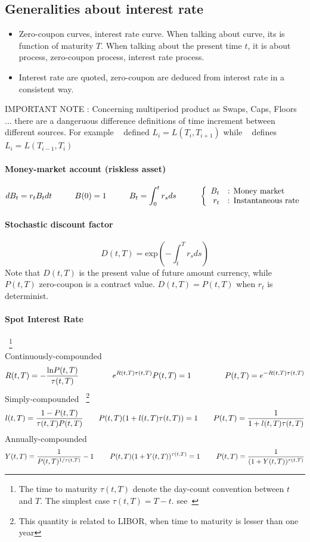\documentclass[a4paper,10pt]{article}
\newcommand{\Bt}{B_t}
\newcommand{\RtT}{R(t,T)}
\newcommand{\PtT}{P(t,T)}
\newcommand{\LtT}{l(t,T)}
\newcommand{\YtT}{Y(t,T)}
\newcommand{\tautT}{\tau(t,T)}
\newcommand{\inttT}{\int_t^T}
\newcommand{\intt}{\int_0^t}
\newcommand{\FuncExp}{\text{exp}}
\newcommand{\FuncLn}{\text{ln}}
\begin{document}
\subsection{Generalities about interest rate}
\begin{itemize}
 \item Zero-coupon curves, interest rate curve. When talking about curve, its is function of maturity $T$. When talking about the present time $t$, it is about process, zero-coupon process, interest rate process.
 \item Interest rate are quoted, zero-coupon are deduced from interest rate in a consistent way.
\end{itemize}
{\color{red}IMPORTANT NOTE : Concerning multiperiod product as Swaps, Caps, Floors ... there are a dangeruous difference definitions of time increment between different sources. For example ~\cite{THAI2013} defined $L_i=L(T_i,T_{i+1})$ while ~\cite{BRIGO2006} defines $L_i=L(T_{i-1},T_i)$}
\paragraph{Money-market account (riskless asset)}
\[
d\Bt=r_t \Bt dt \hspace{1cm} B(0)=1 \hspace{1cm} B_t = \intt r_s ds
\hspace{1cm}
\left\{
\begin{array}{r l}
\Bt &\text{: Money market} \\
r_t &\text{: Instantaneous rate} 
\end{array}
\right.
\]
\paragraph{Stochastic discount factor} 
\[
D(t,T) = \FuncExp\left( -\inttT r_s ds \right)
\]
Note that $D(t,T)$ is the present value of future amount currency, while $\PtT$ zero-coupon is a contract value. $D(t,T)=\PtT$ when $r_t$ is determinist.
\paragraph{Spot Interest Rate}~\footnote{The time to maturity $\tautT$ denote the day-count convention between $t$ and $T$. The simplest case $\tautT=T-t$. see~\cite{PICARDO2014} }\\
Continuously-compounded 
\[
R(t,T) = -\frac{\FuncLn\PtT }{\tautT}
\hspace{1.5cm}
e^{\RtT\tautT}\PtT = 1
\hspace{1.5cm}
\PtT = e^{-\RtT\tautT}
\]
Simply-compounded ~\footnote{This quantity is related to LIBOR, when time to maturity is lesser than one year} 
\[
\LtT = \frac{1-\PtT}{\tautT\PtT}
\hspace{0.7 cm}
\PtT(1+\LtT\tautT)=1
\hspace{0.7cm}
\PtT = \frac{1}{1+\LtT\tautT}
\]
Annually-compounded
\[
\YtT = \frac{1}{\PtT^{1/\tautT}} -1
\hspace{0.8cm}
\PtT(1+\YtT)^{\tautT} = 1
\hspace{0.8cm}
\PtT = \frac{1}{(1+\YtT)^{\tautT}}
\]
\end{document}
